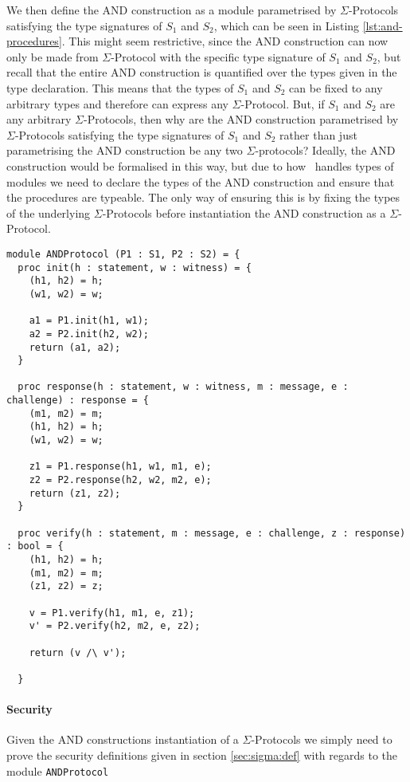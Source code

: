 We then define the AND construction as a module parametrised by
$\Sigma$-Protocols satisfying the type signatures of $S_{1}$ and $S_{2}$, which
can be seen in Listing \ref{lst:and-procedures}. This might seem restrictive,
since the AND construction can now only be made from $\Sigma$-Protocol with the
specific type signature of $S_{1}$ and $S_{2}$, but recall that the entire AND
construction is quantified over the types given in the type declaration. This
means that the types of $S_{1}$ and $S_{2}$ can be fixed to any arbitrary types
and therefore can express any $\Sigma$-Protocol.
But, if $S_{1}$ and $S_{2}$ are any arbitrary $\Sigma$-Protocols, then why are
the AND construction parametrised by $\Sigma$-Protocols satisfying the type
signatures of $S_{1}$ and $S_{2}$ rather than just parametrising the AND
construction be any two $\Sigma$-protocols? Ideally, the AND
construction would be formalised in this way, but due to how \easycrypt\ handles
types of modules we
need to declare the types of the AND construction and ensure that the procedures
are typeable. The only way of ensuring this is by fixing the types of the
underlying $\Sigma$-Protocols before instantiation the AND construction as a $\Sigma$-Protocol.


\begin{lstlisting}[float,label=lst:and-procedures,caption=AND construction]
module ANDProtocol (P1 : S1, P2 : S2) = {
  proc init(h : statement, w : witness) = {
    (h1, h2) = h;
    (w1, w2) = w;

    a1 = P1.init(h1, w1);
    a2 = P2.init(h2, w2);
    return (a1, a2);
  }

  proc response(h : statement, w : witness, m : message, e : challenge) : response = {
    (m1, m2) = m;
    (h1, h2) = h;
    (w1, w2) = w;

    z1 = P1.response(h1, w1, m1, e);
    z2 = P2.response(h2, w2, m2, e);
    return (z1, z2);
  }

  proc verify(h : statement, m : message, e : challenge, z : response) : bool = {
    (h1, h2) = h;
    (m1, m2) = m;
    (z1, z2) = z;

    v = P1.verify(h1, m1, e, z1);
    v' = P2.verify(h2, m2, e, z2);

    return (v /\ v');

  }
\end{lstlisting}

\paragraph{Security}
Given the AND constructions instantiation of a $\Sigma$-Protocols we simply need
to prove the security definitions given in section \ref{sec:sigma:def} with
regards to the module \texttt{ANDProtocol}

